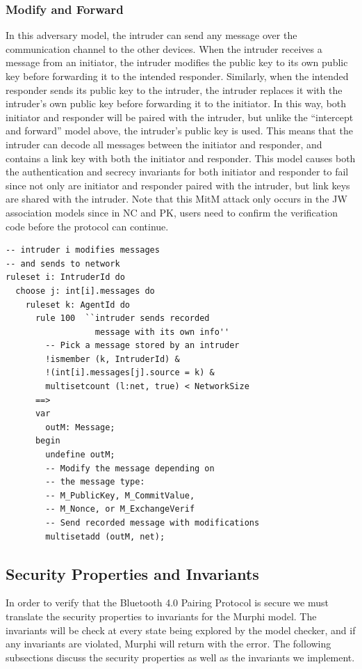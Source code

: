 \documentclass{acm_proc_article-sp}
\begin{document}
\subsubsection{Modify and Forward}
In this adversary model, the intruder can send any message over the communication channel to the other devices. When the intruder receives a message from an initiator, the intruder modifies the public key to its own public key before forwarding it to the intended responder. Similarly, when the intended responder sends its public key to the intruder, the intruder replaces it with the intruder's own public key before forwarding it to the initiator. In this way, both initiator and responder will be paired with the intruder, but unlike the ``intercept and forward'' model above, the intruder's public key is used. This means that the intruder can decode all messages between the initiator and responder, and contains a link key with both the initiator and responder. This model causes both the authentication and secrecy invariants for both initiator and responder to fail since not only are initiator and responder paired with the intruder, but link keys are shared with the intruder. Note that this MitM attack only occurs in the JW association models since in NC and PK, users need to confirm the verification code before the protocol can continue.

\begin{verbatim}
-- intruder i modifies messages
-- and sends to network
ruleset i: IntruderId do
  choose j: int[i].messages do
    ruleset k: AgentId do
      rule 100  ``intruder sends recorded
                  message with its own info''
        -- Pick a message stored by an intruder
        !ismember (k, IntruderId) &
        !(int[i].messages[j].source = k) &
        multisetcount (l:net, true) < NetworkSize
      ==>
      var
        outM: Message;
      begin
        undefine outM;
        -- Modify the message depending on 
        -- the message type:
        -- M_PublicKey, M_CommitValue,
        -- M_Nonce, or M_ExchangeVerif
        -- Send recorded message with modifications
        multisetadd (outM, net);
\end{verbatim}

\subsection{Security Properties and Invariants}
In order to verify that the Bluetooth 4.0 Pairing Protocol is secure we must translate the security properties to invariants for the Murphi model. The invariants will be check at every state being explored by the model checker, and if any invariants are violated, Murphi will return with the error. The following subsections discuss the security properties as well as the invariants we implement.
\end{document}
